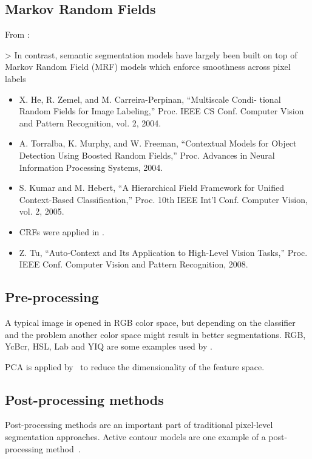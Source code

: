 \subsection{Markov Random Fields}
From \cite{yang2012layered}:

> In contrast, semantic segmentation models have largely been built on top of
Markov Random Field (MRF) models which enforce smoothness across pixel labels

\begin{itemize}
    \item X. He, R. Zemel, and M. Carreira-Perpinan, “Multiscale Condi-
          tional Random Fields for Image Labeling,” Proc. IEEE CS Conf.
          Computer Vision and Pattern Recognition, vol. 2, 2004.
    \item A. Torralba, K. Murphy, and W. Freeman, “Contextual Models for
          Object Detection Using Boosted Random Fields,” Proc. Advances in
          Neural Information Processing Systems, 2004.
    \item S. Kumar and M. Hebert, “A Hierarchical Field Framework for
          Unified Context-Based Classification,” Proc. 10th IEEE Int’l Conf.
          Computer Vision, vol. 2, 2005.
    \item \Glspl{CRF} were applied in \cite{shotton2006textonboost}.
    \item Z. Tu, “Auto-Context and Its Application to High-Level Vision
          Tasks,” Proc. IEEE Conf. Computer Vision and Pattern Recognition,
          2008.
\end{itemize}


\subsection{Pre-processing}\label{subsec:preprocessing}
A typical image is opened in RGB color space, but depending on the classifier
and the problem another color space might result in better segmentations. RGB,
YcBcr, HSL, Lab and YIQ are some examples used by \cite{cohen2015memory}.

\Gls{PCA} is applied by~\cite{chen2011pixel} to reduce the dimensionality of
the feature space.

\subsection{Post-processing methods}\label{subsec:post-processing-methods}
Post-processing methods are an important part of traditional pixel-level
segmentation approaches. Active contour models are one example of a
post-processing method~\cite{kass1988snakes}.


